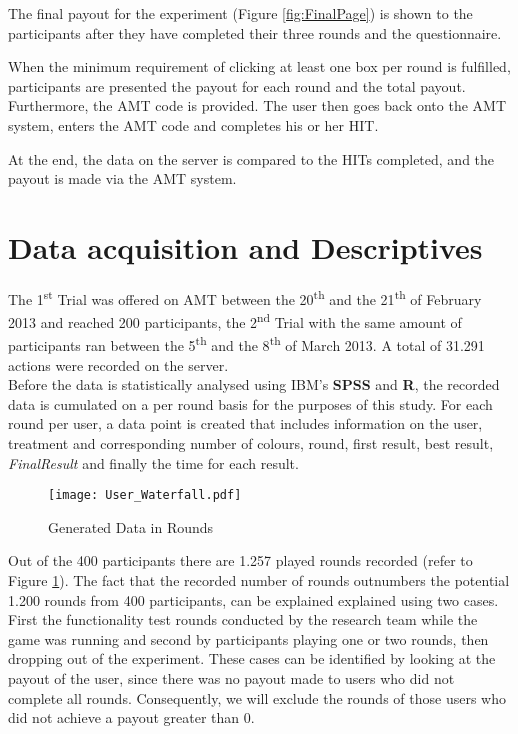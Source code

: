 The final payout for the experiment (Figure \ref{fig:FinalPage}) is shown to the participants after they have completed their three rounds and the questionnaire. 

When the minimum requirement of clicking at least one box per round is fulfilled, participants are presented the payout for each round and the total payout. Furthermore, the \ac{AMT} code is provided.
The user then goes back onto the \ac{AMT} system, enters the \ac{AMT} code and completes his or her \ac{HIT}.

At the end, the data on the server is compared to the \ac{HIT}s completed, and the payout is made via the \ac{AMT} system.

\section{Data acquisition and Descriptives}
\label{ch:Experiment:sec:DataacquisitionDescriptives}
The 1\textsuperscript{st} Trial was offered on \ac{AMT} between the 20\textsuperscript{th} and the 21\textsuperscript{th} of February 2013 and reached 200 participants, the 2\textsuperscript{nd} Trial with the same amount of participants ran between the 5\textsuperscript{th} and the 8\textsuperscript{th} of March 2013. A total of 31.291 actions were recorded on the server.\\
Before the data is statistically analysed using IBM's \textbf{SPSS} and \textbf{R}, the recorded data is cumulated on a per round basis for the purposes of this study. For each round per user, a data point is created that includes information on the user, treatment and corresponding number of colours, round, first result, best result, \textit{FinalResult} and finally the time for each result.
 \begin{figure}[htp] %
\begin{center} %
  \texttt{[image: User\_Waterfall.pdf]}
  \caption{Generated Data in Rounds}
  \label{Data}
\end{center}
\end{figure}
Out of the 400 participants there are 1.257 played rounds recorded (refer to Figure \ref{Data}). The fact that the recorded number of rounds outnumbers the potential 1.200 rounds from 400 participants, can be explained explained using two cases. First the functionality test rounds conducted by the research team while the game was running and second by participants playing one or two rounds, then dropping out of the experiment. These cases can be identified by looking at the payout of the user, since there was no payout made to users who did not complete all rounds. Consequently, we will exclude the rounds of those users who did not achieve a payout greater than 0.\\
